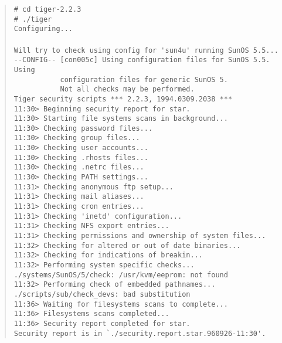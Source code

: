 \begin{quote}
\begin{scriptsize}
\verb+# cd tiger-2.2.3+\\
\verb+# ./tiger+\\
\verb+Configuring...+\\
\verb++\\
\verb+Will try to check using config for 'sun4u' running SunOS 5.5...+\\
\verb+--CONFIG-- [con005c] Using configuration files for SunOS 5.5. Using+\\
\verb+           configuration files for generic SunOS 5.+\\
\verb+           Not all checks may be performed.+\\
\verb+Tiger security scripts *** 2.2.3, 1994.0309.2038 ***+\\
\verb+11:30> Beginning security report for star.+\\
\verb+11:30> Starting file systems scans in background...+\\
\verb+11:30> Checking password files...+\\
\verb+11:30> Checking group files...+\\
\verb+11:30> Checking user accounts...+\\
\verb+11:30> Checking .rhosts files...+\\
\verb+11:30> Checking .netrc files...+\\
\verb+11:30> Checking PATH settings...+\\
\verb+11:31> Checking anonymous ftp setup...+\\
\verb+11:31> Checking mail aliases...+\\
\verb+11:31> Checking cron entries...+\\
\verb+11:31> Checking 'inetd' configuration...+\\
\verb+11:31> Checking NFS export entries...+\\
\verb+11:31> Checking permissions and ownership of system files...+\\
\verb+11:32> Checking for altered or out of date binaries...+\\
\verb+11:32> Checking for indications of breakin...+\\
\verb+11:32> Performing system specific checks...+\\
\verb+./systems/SunOS/5/check: /usr/kvm/eeprom: not found+\\
\verb+11:32> Performing check of embedded pathnames...+\\
\verb+./scripts/sub/check_devs: bad substitution+\\
\verb+11:36> Waiting for filesystems scans to complete...+\\
\verb+11:36> Filesystems scans completed...+\\
\verb+11:36> Security report completed for star.+\\
\verb+Security report is in `./security.report.star.960926-11:30'.+
\end{scriptsize}
\end{quote}

